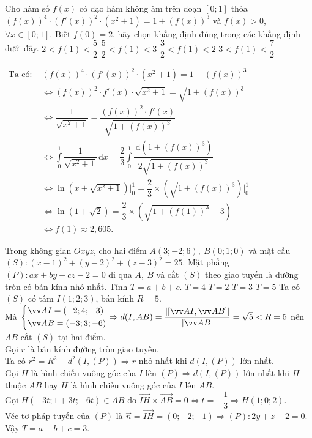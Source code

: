 \begin{ex}%
	Cho hàm số $f(x)$ có đạo hàm không âm trên đoạn $[0;1]$ thỏa $\left(f(x)\right)^4\cdot\left(f'(x)\right)^2\cdot(x^2+1)=1+\left(f(x)\right)^3$ và $f(x)>0$, $\forall x \in [0;1]$. Biết $f(0)=2$, hãy chọn khẳng định đúng trong các khẳng định dưới đây.
	\choice
	{$2<f(1)<\dfrac{5}{2}$}
	{\True $\dfrac{5}{2}<f(1)<3$}
	{$\dfrac{3}{2}<f(1)<2$}
	{$3<f(1)<\dfrac{7}{2}$}
	\loigiai
	{
	 
	 $\begin{aligned}
	 \text{Ta có: }&\left(f(x)\right)^4\cdot\left(f'(x)\right)^2\cdot(x^2+1)=1+\left(f(x)\right)^3\\
	 &\Leftrightarrow \left(f(x)\right)^2\cdot f'(x)\cdot\sqrt{x^2+1}=\sqrt{1+\left(f(x)\right)^3}\\
	 &\Leftrightarrow \dfrac{1}{\sqrt{x^2+1}}=\dfrac{\left(f(x)\right)^2\cdot f'(x)}{\sqrt{1+\left(f(x)\right)^3}}\\
	 &\Leftrightarrow\displaystyle\int\limits_0^1 \dfrac{1}{\sqrt{x^2+1}} \mathrm{\,d}x=\dfrac{2}{3}\displaystyle\int\limits_0^1\dfrac{\mathrm{\,d}\left(1+\left(f(x)\right)^3\right)}{2\sqrt{1+\left(f(x)\right)^3}}\\
	 &\Leftrightarrow\ln\left(x+\sqrt{x^2+1}\right)\bigg|_0^1=\dfrac{2}{3}\times\left(\sqrt{1+\left(f(x)\right)^3}\right)\bigg|_0^1\\&\Leftrightarrow \ln\left(1+\sqrt{2}\right)=\dfrac{2}{3}\times\left(\sqrt{1+\left(f(1)\right)^3}-3\right)\\
	 &\Leftrightarrow f(1)\approx 2{,}605.
	 \end{aligned}$
	}
\end{ex}

\begin{ex}%
	Trong không gian $Oxyz$, cho hai điểm $A(3;-2;6),~B(0;1;0)$ và mặt cầu $(S):(x-1)^2+(y-2)^2+(z-3)^2=25$. Mặt phẳng $(P): ax+by+cz-2=0$ đi qua $A,~B$ và cắt $(S)$ theo giao tuyến là đường tròn có bán kính nhỏ nhất. Tính $T=a+b+c$.
	\choice
	{$T=4$}
	{$T=2$}
	{\True $T=3$}
	{$T=5$}
	\loigiai
	{
		Ta có $(S)$ có tâm $I(1;2;3)$, bán kính $R=5$.\\
		Mà $\heva{&\vec{AI}=(-2;4;-3)\\&\vec{AB}=(-3;3;-6)}\Rightarrow d(I,AB)=\dfrac{\left|\left[\vec{AI},\vec{AB}\right]\right|}{\left|\vec{AB}\right|}=\sqrt{5}<R=5$ nên $AB$ cắt $(S)$ tại hai điểm.\\
		Gọi $r$ là bán kính đường tròn giao tuyến.\\
		Ta có $r^2=R^2-d^2(I,(P)) \Rightarrow r$ nhỏ nhất khi $d(I,(P))$ lớn nhất.\\
		Gọi $H$ là hình chiếu vuông góc của $I$ lên $(P) \Rightarrow d(I,(P))$ lớn nhất khi $H$ thuộc $AB$ hay $H$ là hình chiếu vuông góc của $I$ lên $AB$.\\
		Gọi $H(-3t;1+3t;-6t) \in AB$ do $\vec{IH}\times\vec{AB}=0\Leftrightarrow t=-\dfrac{1}{3}\Rightarrow H(1;0;2)$.\\
		Véc-tơ pháp tuyến của $(P)$ là $\vec{n}=\vec{IH}=(0;-2;-1)\Rightarrow(P):2y+z-2=0$.\\
		Vậy $T=a+b+c=3$. 
		}
\end{ex}

